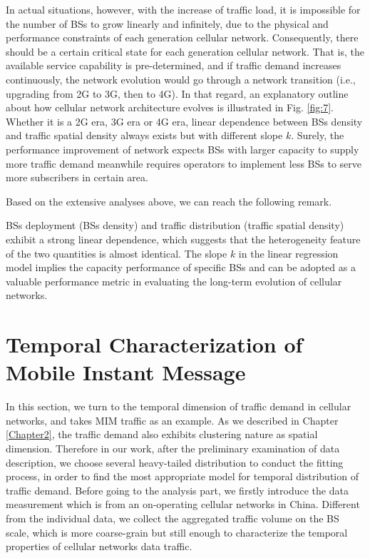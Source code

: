 In actual situations, however, with the increase of traffic load, it is impossible for the number of BSs to grow linearly and infinitely, due to the physical and performance constraints of each generation cellular network. Consequently, there should be a certain critical state for each generation cellular network. That is, the available service capability is pre-determined, and if traffic demand increases continuously, the network evolution would go through a network transition (i.e., upgrading from 2G to 3G, then to 4G). In that regard, an explanatory outline about how cellular network architecture evolves is illustrated in Fig. \ref{fig:7}. Whether it is a 2G era, 3G era or 4G era, linear dependence between BSs density and traffic spatial density always exists but with different slope ${k}$. Surely, the performance improvement of network expects BSs with larger capacity to supply more traffic demand meanwhile requires operators to implement less BSs to serve more subscribers in certain area.

Based on the extensive analyses above, we can reach the following remark.
\begin{remark}
BSs deployment (BSs density) and traffic distribution (traffic spatial density) exhibit a strong linear dependence, which suggests that the heterogeneity feature of the two quantities is almost identical. The slope ${k}$ in the linear regression model implies the capacity performance of specific BSs and can be adopted as a valuable performance metric in evaluating the long-term evolution of cellular networks.
\end{remark}
\section{Temporal Characterization of Mobile Instant Message} \label{sec4-mim}
In this section, we turn to the temporal dimension of traffic demand in cellular networks, and takes MIM traffic as an example. As we described in Chapter \ref{Chapter2}, the traffic demand also exhibits clustering nature as spatial dimension. Therefore in our work, after the preliminary examination of data description, we choose several heavy-tailed distribution to conduct the fitting process, in order to find the most appropriate model for temporal distribution of traffic demand.
Before going to the analysis part, we firstly introduce the data measurement which is from an on-operating cellular networks in China. Different from the individual data, we collect the aggregated traffic volume on the BS scale, which is more coarse-grain but still enough to characterize the temporal properties of cellular networks data traffic.
